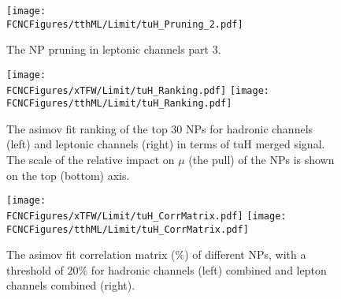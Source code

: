 \begin{figure}[htb]
\centering
\texttt{[image: \\FCNCFigures/tthML/Limit/tuH\_Pruning\_2.pdf]}
\caption{ The NP pruning in leptonic channels part 3. }
\label{fig:tthML_pruning_2}
\end{figure}

\begin{figure}[htb]
\centering
\texttt{[image: \\FCNCFigures/xTFW/Limit/tuH\_Ranking.pdf]}
\texttt{[image: \\FCNCFigures/tthML/Limit/tuH\_Ranking.pdf]}
\caption{ The asimov fit ranking of the top 30 NPs for hadronic channels (left) and leptonic channels (right) in terms of tuH merged signal. The scale of the relative impact on $\mu$ (the pull) of the NPs is shown on the top (bottom) axis.}
\label{fig:fcnc_rank_data}
\end{figure}

\begin{figure}[htb]
\centering
\texttt{[image: \\FCNCFigures/xTFW/Limit/tuH\_CorrMatrix.pdf]}
\texttt{[image: \\FCNCFigures/tthML/Limit/tuH\_CorrMatrix.pdf]}
\caption{ The asimov fit correlation matrix ($\%$) of different NPs, with a threshold of $20\%$ for hadronic channels (left) combined and lepton channels combined (right). }
\label{fig:fcnc_correl_data}
\end{figure}
